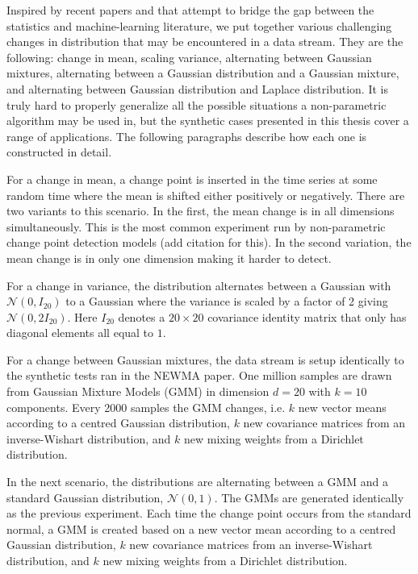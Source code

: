 Inspired by recent papers \cite{chang2019kernel} and \cite{flynn2019change} that attempt to bridge the gap between the statistics and machine-learning literature, we put together various challenging changes in distribution that may be encountered in a data stream. They are the following: change in mean, scaling variance, alternating between Gaussian mixtures, alternating between a Gaussian distribution and a Gaussian mixture, and alternating between Gaussian distribution and Laplace distribution. It is truly hard to properly generalize all the possible situations a non-parametric algorithm may be used in, but the synthetic cases presented in this thesis cover a range of applications. The following paragraphs describe how each one is constructed in detail.

For a change in mean, a change point is inserted in the time series at some random time where the mean is shifted either positively or negatively. There are two variants to this scenario. In the first, the mean change is in all dimensions simultaneously. This is the most common experiment run by non-parametric change point detection models (add citation for this). In the second variation, the mean change is in only one dimension making it harder to detect. 

For a change in variance, the distribution alternates between a Gaussian with $\mathcal{N}(0, I_{20})$ to a Gaussian where the variance is scaled by a factor of 2 giving $\mathcal{N}(0,2I_{20})$. Here $I_{20}$ denotes a $20 \times 20$ covariance identity matrix that only has diagonal elements all equal to $1$. 

For a change between Gaussian mixtures, the data stream is setup identically to the synthetic tests ran in the NEWMA paper. One million samples are drawn from Gaussian Mixture Models (GMM) in dimension $d = 20$
with $k = 10$ components. Every 2000 samples the GMM changes, i.e. $k$
new vector means according to a centred Gaussian distribution, $k$ new covariance matrices from an
inverse-Wishart distribution, and $k$ new mixing weights from a Dirichlet distribution. 

In the next scenario, the distributions are alternating between a GMM and a standard Gaussian distribution, $\mathcal{N}(0,1)$. The GMMs are generated identically as the previous experiment. Each time the change point occurs from the standard normal, a GMM is created based on a new vector mean according to a centred Gaussian distribution, $k$ new covariance matrices from an
inverse-Wishart distribution, and $k$ new mixing weights from a Dirichlet distribution. 

